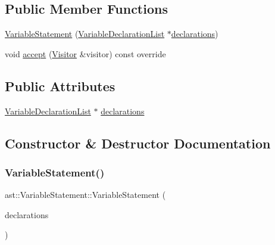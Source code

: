 \subsection*{Public Member Functions}
\begin{DoxyCompactItemize}
\item 
\hyperlink{structast_1_1_variable_statement_a0e426eb5d18c19159737d4b2ad1f6856}{Variable\+Statement} (\hyperlink{structast_1_1_variable_declaration_list}{Variable\+Declaration\+List} $\ast$\hyperlink{structast_1_1_variable_statement_aa418c942437dae47f6368630199066eb}{declarations})
\item 
void \hyperlink{structast_1_1_variable_statement_a79a66f04eccbb99d1c7dddc5f0d59fcb}{accept} (\hyperlink{structast_1_1_visitor}{Visitor} \&visitor) const override
\end{DoxyCompactItemize}
\subsection*{Public Attributes}
\begin{DoxyCompactItemize}
\item 
\hyperlink{structast_1_1_variable_declaration_list}{Variable\+Declaration\+List} $\ast$ \hyperlink{structast_1_1_variable_statement_aa418c942437dae47f6368630199066eb}{declarations}
\end{DoxyCompactItemize}


\subsection{Constructor \& Destructor Documentation}
\mbox{\label{structast_1_1_variable_statement_a0e426eb5d18c19159737d4b2ad1f6856}} 
\subsubsection{\texorpdfstring{Variable\+Statement()}{VariableStatement()}}
{\footnotesize\ttfamily ast\+::\+Variable\+Statement\+::\+Variable\+Statement (\begin{DoxyParamCaption}\item[{\hyperlink{structast_1_1_variable_declaration_list}{Variable\+Declaration\+List} $\ast$}]{declarations }\end{DoxyParamCaption})\hspace{0.3cm}{\ttfamily [inline]}}



